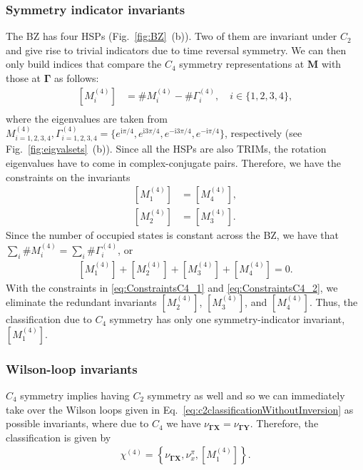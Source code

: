 \subsubsection*{Symmetry indicator invariants}
The BZ has four HSPs (Fig.~\ref{fig:BZ}~(b)). Two of them are invariant under $C_2$ and give rise to trivial indicators due to time reversal symmetry. 
We can then only build indices that compare the $C_4$ symmetry representations at $\mathbf{M}$ with those at $\mathbf{\Gamma}$ as follows:
\begin{equation}
 \begin{aligned}
[M_i^{(4)}] &= \#M_i^{(4)} - \#\Gamma^{(4)}_i, \quad i \in \{1,2,3,4\},   \\
\end{aligned} 
\end{equation}
where the eigenvalues are taken from $M^{(4)}_{i=1,2,3,4}, \Gamma^{(4)}_{i=1,2,3,4}=\{e^{\mathrm{i} \pi/4}, e^{\mathrm{i} 3\pi/4}, e^{-\mathrm{i} 3\pi/4}, e^{-\mathrm{i} \pi/4}\}$, respectively (see Fig.~\ref{fig:eigvalsets}~(b)).
Since all the HSPs are also TRIMs, the rotation eigenvalues have to come in complex-conjugate pairs. Therefore, we have the constraints on the invariants
\begin{equation}
 \begin{aligned}
[M_1^{(4)}] &= [M_4^{(4)}], \\
[M_2^{(4)}] &= [M_3^{(4)}].
\label{eq:ConstraintsC4_1}
\end{aligned} 
\end{equation}
Since the number of occupied states is constant across the BZ, we have that $\sum_i \# M_i^{(4)} = \sum_i \# \Gamma^{(4)}_i$, or
\begin{equation} 
\begin{aligned}
[M_1^{(4)}]+[M_2^{(4)}]+[M_3^{(4)}]+[M_4^{(4)}]=0.
\label{eq:ConstraintsC4_2}
\end{aligned} 
\end{equation}
With the constraints in \eqref{eq:ConstraintsC4_1} and \eqref{eq:ConstraintsC4_2}, we eliminate the redundant invariants $[M_2^{(4)}]$, $[M_3^{(4)}]$, and $[M_4^{(4)}]$. Thus, the classification due to $C_4$ symmetry has only one symmetry-indicator invariant, $[M_1^{(4)}]$.

\subsubsection*{Wilson-loop invariants} 
$C_4$ symmetry implies having $C_2$ symmetry as well and so we can immediately take over the Wilson loops given in Eq.~\eqref{eq:c2classificationWithoutInversion} as possible invariants, where due to $C_4$ we have $\nu_{\mathbf{\Gamma X}} = \nu_{\mathbf{\Gamma Y}}$. Therefore, the classification is given by
\begin{equation}
 \begin{aligned}
\chi^{(4)}=\left\{\nu_{\mathbf{\Gamma X}}, \nu_{x}^{\pi}, [M_1^{(4)}] \right\}.
\end{aligned} 
\end{equation}
